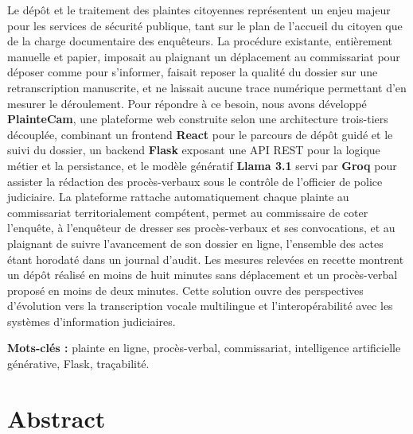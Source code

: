 \documentclass[12pt,a4paper,oneside]{extbook}
\begin{document}
Le dépôt et le traitement des plaintes citoyennes représentent un enjeu majeur pour les services de sécurité publique, tant sur le plan de l'accueil du citoyen que de la charge documentaire des enquêteurs. La procédure existante, entièrement manuelle et papier, imposait au plaignant un déplacement au commissariat pour déposer comme pour s'informer, faisait reposer la qualité du dossier sur une retranscription manuscrite, et ne laissait aucune trace numérique permettant d'en mesurer le déroulement. Pour répondre à ce besoin, nous avons développé \textbf{PlainteCam}, une plateforme web construite selon une architecture trois-tiers découplée, combinant un frontend \textbf{React} pour le parcours de dépôt guidé et le suivi du dossier, un backend \textbf{Flask} exposant une API REST pour la logique métier et la persistance, et le modèle génératif \textbf{Llama 3.1} servi par \textbf{Groq} pour assister la rédaction des procès-verbaux sous le contrôle de l'officier de police judiciaire. La plateforme rattache automatiquement chaque plainte au commissariat territorialement compétent, permet au commissaire de coter l'enquête, à l'enquêteur de dresser ses procès-verbaux et ses convocations, et au plaignant de suivre l'avancement de son dossier en ligne, l'ensemble des actes étant horodaté dans un journal d'audit. Les mesures relevées en recette montrent un dépôt réalisé en moins de huit minutes sans déplacement et un procès-verbal proposé en moins de deux minutes. Cette solution ouvre des perspectives d'évolution vers la transcription vocale multilingue et l'interopérabilité avec les systèmes d'information judiciaires.

\vspace{0.4cm}
\noindent\textbf{Mots-clés :} plainte en ligne, procès-verbal, commissariat, intelligence artificielle générative, Flask, traçabilité.

\chapter*{Abstract}
\end{document}
